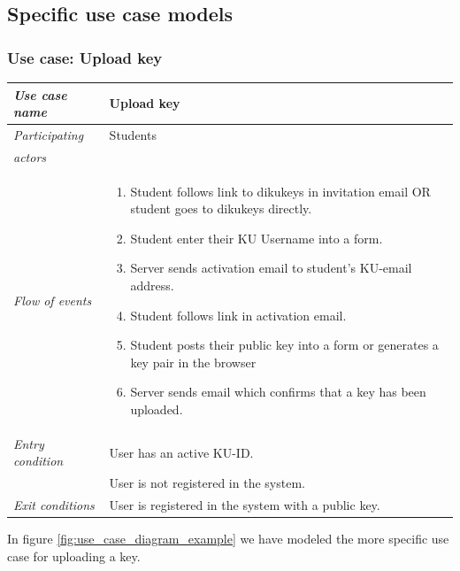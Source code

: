 \documentclass[11pt,a4paper]{report}
\begin{document}
\subsection{Specific use case models}\label{subsec:Specific_Use_case_model}

\subsubsection{Use case: Upload key}
\begin{tabular}{l p{}}
    \toprule
    \textit{Use case name} & Upload key \\
    \midrule
    \textit{Participating} & Students \\
    \textit{actors} & \\
    \midrule
    \textit{Flow of events} &
    \vspace{-6.7mm} \begin{enumerate}
        \item Student follows link to dikukeys in invitation email OR student goes to dikukeys directly.
        \item Student enter their KU Username into a form.
        \item Server sends activation email to student's KU-email address.
        \item Student follows link in activation email.
        \item Student posts their public key into a form or generates a key pair in the browser
        \item Server sends email which confirms that a key has been uploaded.
    \end{enumerate}
    \\
    \midrule
    \textit{Entry condition} & User has an active KU-ID. \\
                             & User is not registered in the system. \\
    \midrule
    \textit{Exit conditions} & User is registered in the system with a public key. \\
    \bottomrule
\end{tabular}

In figure \ref{fig:use_case_diagram_example} we have modeled the more specific use case for uploading a key.
\end{document}
